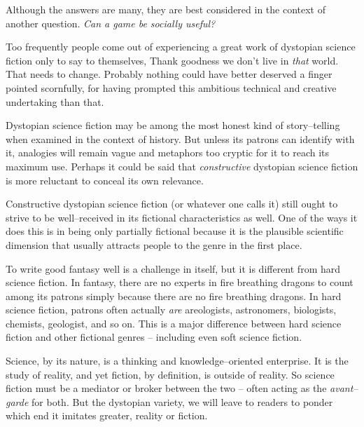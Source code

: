 

Although the answers are many, they are best considered in the context of another question. {\it Can a game be socially useful?}

Too frequently people come out of experiencing a great work of dystopian science fiction only to say to themselves, Thank goodness we don't live in {\it that} world. That needs to change. Probably nothing could have better deserved a finger pointed scornfully, for having prompted this ambitious technical and creative undertaking than that.

Dystopian science fiction may be among the most honest kind of story--telling when examined in the context of history. But unless its patrons can identify with it, analogies will remain vague and metaphors too cryptic for it to reach its maximum use. Perhaps it could be said that {\it constructive} dystopian science fiction is more reluctant to conceal its own relevance.

    {}

Constructive dystopian science fiction (or whatever one calls it) still ought to strive to be well--received in its fictional characteristics as well. One of the ways it does this is in being only partially fictional because it is the plausible scientific dimension that usually attracts people to the genre in the first place.

To write good fantasy well is a challenge in itself, but it is different from hard science fiction. In fantasy, there are no experts in fire breathing dragons to count among its patrons simply because there are no fire breathing dragons. In hard science fiction, patrons often actually {\it are} areologists, astronomers, biologists, chemists, geologist, and so on. This is a major difference between hard science fiction and other fictional genres -- including even soft science fiction. 

Science, by its nature, is a thinking and knowledge--oriented enterprise. It is the study of reality, and yet fiction, by definition, is outside of reality. So science fiction must be a mediator or broker between the two -- often acting as the {\it avant--garde} for both. But the dystopian variety, we will leave to readers to ponder which end it imitates greater, reality or fiction.

